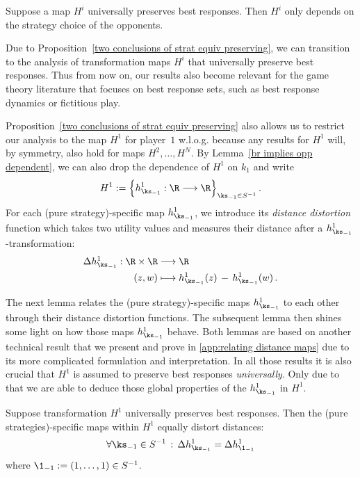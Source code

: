 \begin{lemma}
\label{br implies opp dependent}
Suppose a map $H^i$ universally preserves best responses. Then $H^i$ only depends on the strategy choice of the opponents.
\end{lemma}

Due to Proposition~\ref{two conclusions of strat equiv preserving}, we can transition to the analysis of transformation maps $H^i$ that universally preserve best responses. Thus from now on, our results also become relevant for the game theory literature that focuses on best response sets, such as best response dynamics  or fictitious play.

Proposition~\ref{two conclusions of strat equiv preserving} also allows us to restrict our analysis to the map $H^1$ for player~$1$ w.l.o.g. because any results for $H^1$ will, by symmetry, also hold for maps $H^2,\ldots,H^N$. By Lemma~\ref{br implies opp dependent}, we can also drop the dependence of $H^1$ on $k_1$ and write
\[H^1 := \Big\{ h_{\ks_{-1}}^1 : \R \longrightarrow \R \Big\}_{\ks_{-1} \in S^{-1}} \, . \]
 For each (pure strategy)-specific map $h_{\ks_{-1}}^1$, we introduce its \textit{distance distortion} function which takes two utility values and measures their distance after a $h_{\ks_{-1}}^1$-transformation:
\begin{align}
\label{def dist dist fct}
\begin{aligned}
\Delta h_{\ks_{-1}}^1 : \R \times \R &\longrightarrow \R 
\\
(z,w) &\longmapsto h_{\ks_{-1}}^1(z) \, - \, h_{\ks_{-1}}^1(w) \, .
\end{aligned}
\end{align}

The next lemma relates the (pure strategy)-specific maps $h_{\ks_{-1}}^1$ to each other through their distance distortion functions. The subsequent lemma then shines some light on how those maps $h_{\ks_{-1}}^1$ behave. Both lemmas are based on another technical result that we present and prove in \ref{app:relating distance maps} due to its more complicated formulation and interpretation. In all those results it is also crucial that $H^1$ is assumed to preserve best responses \textit{universally}. Only due to that we are able to deduce those global properties of the $h_{\ks_{-1}}^1$ in $H^1$.

\begin{lemma}
\label{same distance distortion functions}
Suppose transformation $H^1$ universally preserves best responses. Then the (pure strategies)-specific maps within $H^1$ equally distort distances:
\[\forall \ks_{-1} \in S^{-1} \, : \, \Delta h_{\ks_{-1}}^1 = \Delta h_{\1_{-1}}^1 \]
where $\1_{-1} := (1, \ldots, 1) \in S^{-1}$.
\end{lemma}

